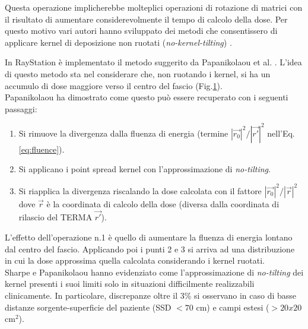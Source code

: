 {\begin{figure}
\label{fig:kern_tilt}
\end{figure}
Questa operazione implicherebbe molteplici operazioni di rotazione di matrici \cite{Sharpe1997} con il risultato di aumentare considerevolmente il tempo di calcolo della dose. 
Per questo motivo vari autori hanno sviluppato dei metodi che consentissero di applicare kernel di deposizione non ruotati (\textit{no-kernel-tilting}) \cite{Sharpe1997,Papanikolaou1993}.

In RayStation è implementato il metodo suggerito da Papanikolaou et al. \cite{Papanikolaou1993}. L'idea di questo metodo sta nel considerare che, non ruotando i kernel, si ha un accumulo di dose maggiore verso il centro del fascio (Fig.\ref{fig:kern_tilt}).\\ 
Papanikolaou ha dimostrato come questo può essere recuperato con i seguenti passaggi:
\begin{enumerate}
\item Si rimuove la divergenza dalla fluenza di energia (termine $|\vec{r_0}|^2/|\vec{r'}|^2$ nell'Eq.\eqref{eq:fluence}).
\item Si applicano i point spread kernel con l'approssimazione di \textit{no-tilting}.
\item Si riapplica la divergenza riscalando la dose calcolata con il fattore $|\vec{r_0}|^2/|\vec{r}|^2$ dove $\vec{r}$ è la coordinata di calcolo della dose (diversa dalla coordinata di rilascio del TERMA $\vec{r'}$).
\end{enumerate}
L'effetto dell'operazione n.1 è quello di aumentare la fluenza di energia lontano dal centro del fascio. Applicando poi i punti 2 e 3 si arriva ad una distribuzione in cui la dose approssima quella calcolata considerando i kernel ruotati.\\
Sharpe e Papanikolaou \cite{Sharpe1997,Papanikolaou1993} hanno evidenziato come l'approssimazione di \textit{no-tilting} dei kernel presenti i suoi limiti solo in situazioni difficilmente realizzabili clinicamente. In particolare, discrepanze oltre il 3\% si osservano in caso di basse distanze sorgente-superficie del paziente (SSD $< 70$ cm) e campi estesi ($> 20x20$ cm$^2$).



}
